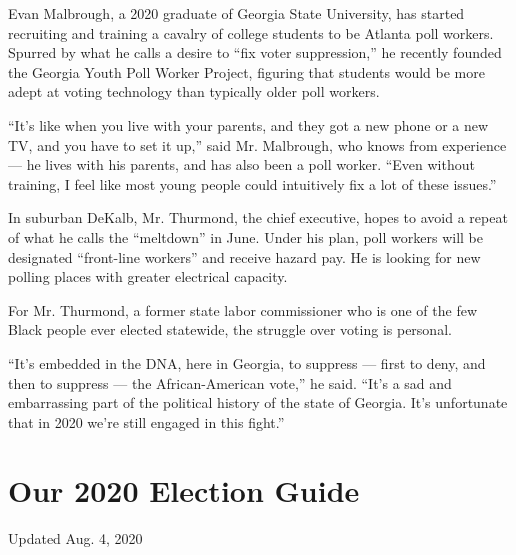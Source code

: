 Evan Malbrough, a 2020 graduate of Georgia State University, has started
recruiting and training a cavalry of college students to be Atlanta poll
workers. Spurred by what he calls a desire to ``fix voter suppression,''
he recently founded the Georgia Youth Poll Worker Project, figuring that
students would be more adept at voting technology than typically older
poll workers.

``It's like when you live with your parents, and they got a new phone or
a new TV, and you have to set it up,'' said Mr. Malbrough, who knows
from experience --- he lives with his parents, and has also been a poll
worker. ``Even without training, I feel like most young people could
intuitively fix a lot of these issues.''

In suburban DeKalb, Mr. Thurmond, the chief executive, hopes to avoid a
repeat of what he calls the ``meltdown'' in June. Under his plan, poll
workers will be designated ``front-line workers'' and receive hazard
pay. He is looking for new polling places with greater electrical
capacity.

For Mr. Thurmond, a former state labor commissioner who is one of the
few Black people ever elected statewide, the struggle over voting is
personal.

``It's embedded in the DNA, here in Georgia, to suppress --- first to
deny, and then to suppress --- the African-American vote,'' he said.
``It's a sad and embarrassing part of the political history of the state
of Georgia. It's unfortunate that in 2020 we're still engaged in this
fight.''

\hypertarget{our-2020-election-guide}{%
\section{Our 2020 Election Guide}\label{our-2020-election-guide}}

Updated Aug. 4, 2020

